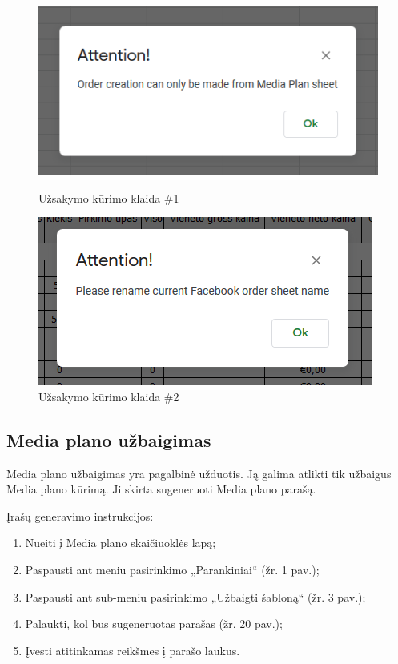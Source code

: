 \begin{figure}[h]
    \centering
    \begin{minipage}{0.45\textwidth}
        \centering
        \includegraphics[scale=0.6]{Images/Screenshots/order-alert.PNG} 
        \caption{Užsakymo kūrimo klaida \#1}
    \end{minipage}\hfill
    \begin{minipage}{0.45\textwidth}
        \centering
        \includegraphics[scale=0.6]{Images/Screenshots/modal-order-alert.PNG}
        \caption{Užsakymo kūrimo klaida \#2}
    \end{minipage}
\end{figure}

\subsection{Media plano užbaigimas}
Media plano užbaigimas yra pagalbinė užduotis. Ją galima atlikti tik užbaigus Media plano kūrimą. Ji skirta sugeneruoti Media plano parašą.

\bigskip
Įrašų generavimo instrukcijos: 
\begin{enumerate}
    \itemsep0em 
    \item Nueiti į Media plano skaičiuoklės lapą;
    \item Paspausti ant meniu pasirinkimo „Parankiniai“ (žr. 1 pav.);
    \item Paspausti ant sub-meniu pasirinkimo „Užbaigti šabloną“ (žr. 3 pav.);
    \item Palaukti, kol bus sugeneruotas parašas (žr. 20 pav.);
    \item Įvesti atitinkamas reikšmes į parašo laukus.
\end{enumerate}

